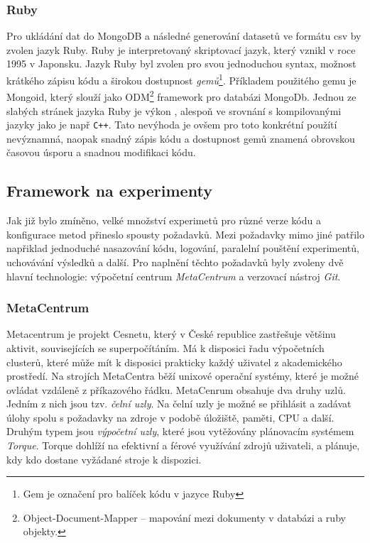 \documentclass[thesis=M,czech]{FITthesis}[2012/06/26]
\begin{document}
\subsubsection*{Ruby}
Pro ukládání dat do MongoDB a následné generování datasetů ve formátu csv by zvolen jazyk Ruby. Ruby je interpretovaný skriptovací jazyk, který vznikl v roce 1995 v Japonsku.
Jazyk Ruby byl zvolen pro svou jednoduchou syntax, možnost krátkého zápisu kódu a širokou dostupnost \textit{gemů}\footnote{Gem je označení pro balíček kódu v jazyce Ruby}. Příkladem použitého gemu je Mongoid, který slouží jako ODM\footnote{Object-Document-Mapper -- mapování mezi dokumenty v databázi a ruby objekty.} framework pro databázi MongoDb.
Jednou ze slabých stránek jazyka Ruby je výkon \cite{ruby_performance}, alespoň ve srovnání s kompilovanými jazyky jako je např \texttt{C++}. Tato nevýhoda je ovšem pro toto konkrétní použítí nevýznamná, naopak snadný zápis kódu a dostupnost gemů znamená obrovskou časovou úsporu a snadnou modifikaci kódu.


\subsection{Framework na experimenty}
Jak již bylo zmíněno, velké množství experimetů pro různé verze kódu a konfigurace metod přineslo spousty požadavků. Mezi požadavky mimo jiné patřilo napřiklad jednoduché nasazování kódu, logování, paralelní pouštění experimentů, uchovávání výsledků a další. Pro naplnění těchto požadavků byly zvoleny dvě hlavní technologie: výpočetní centrum \textit{MetaCentrum} a verzovací nástroj \textit{Git}.


\subsubsection*{MetaCentrum}
Metacentrum je projekt Cesnetu, který v České republice zastřešuje většinu aktivit, souvisejících se superpočítáním. Má k disposici řadu výpočetních clusterů, které může mít k disposici prakticky každý uživatel z akademického prostředí.
Na strojích MetaCentra běží unixové operační systémy, které je možné ovládat vzdáleně z příkazového řádku. MetaCenrum obsahuje dva druhy uzlů. Jedním z nich jsou tzv. \textit{čelní uzly}.
Na čelní uzly je možné se přihlásit a zadávat úlohy spolu s požadavky na zdroje v podobě úložiště, paměti, CPU a další.
Druhým typem jsou \textit{výpočetní uzly}, které jsou vytěžovány plánovacím systémem \textit{Torque}. Torque dohlíží na efektivní a férové využívání zdrojů uživateli, a plánuje, kdy kdo dostane vyžádané stroje k dispozici. \cite{metacentrum}
\end{document}
